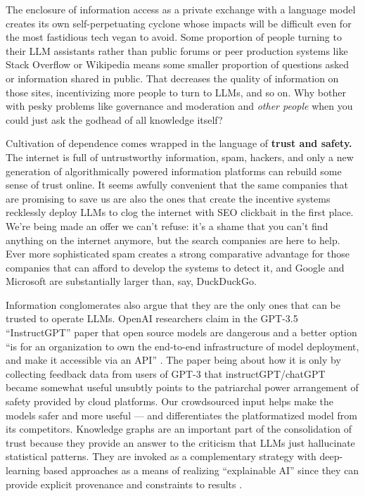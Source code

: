 The enclosure of information access as a private exchange with a
language model creates its own self-perpetuating cyclone whose impacts
will be difficult even for the most fastidious tech vegan to avoid. Some
proportion of people turning to their LLM assistants rather than public
forums or peer production systems like Stack Overflow or Wikipedia means
some smaller proportion of questions asked or information shared in
public. That decreases the quality of information on those sites,
incentivizing more people to turn to LLMs, and so on. Why bother with
pesky problems like governance and moderation and \emph{other people}
when you could just ask the godhead of all knowledge itself?

Cultivation of dependence comes wrapped in the language of \textbf{trust
and safety.} The internet is full of untrustworthy information, spam,
hackers, and only a new generation of algorithmically powered
information platforms can rebuild some sense of trust online. It seems
awfully convenient that the same companies that are promising to save us
are also the ones that create the incentive systems recklessly deploy
LLMs to clog the internet with SEO clickbait in the first place. We're
being made an offer we can't refuse: it's a shame that you can't find
anything on the internet anymore, but the search companies are here to
help. Ever more sophisticated spam creates a strong comparative
advantage for those companies that can afford to develop the systems to
detect it, and Google and Microsoft are substantially larger than, say,
DuckDuckGo.

Information conglomerates also argue that they are the only ones that
can be trusted to operate LLMs. OpenAI researchers claim in the GPT-3.5
``InstructGPT'' paper that open source models are dangerous and a better
option ``is for an organization to own the end-to-end infrastructure of
model deployment, and make it accessible via an API'' \cite{ouyangTrainingLanguageModels2022} . The paper being about how it is
only by collecting feedback data from users of GPT-3 that
instructGPT/chatGPT became somewhat useful unsubtly points to the
patriarchal power arrangement of safety provided by cloud platforms. Our
crowdsourced input helps make the models safer and more useful --- and
differentiates the platformatized model from its competitors. Knowledge
graphs are an important part of the consolidation of trust because they
provide an answer to the criticism that LLMs just hallucinate
statistical patterns. They are invoked as a complementary strategy with deep-learning
based approaches as a means of realizing ``explainable AI'' since they
can provide explicit provenance and constraints to results \cite{lecueRoleKnowledgeGraphs2020, janowiczNeuralsymbolicIntegrationSemantic2020, tiddiKnowledgeGraphsEXplainable2020} .

